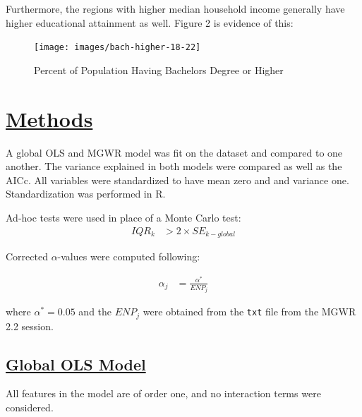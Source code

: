 \documentclass[
]{article}
\begin{document}
\newpage

Furthermore, the regions with higher median household income generally
have higher educational attainment as well. Figure 2 is evidence of
this:

\begin{figure}[H]

{\centering \texttt{[image: images/bach-higher-18-22]} 

}

\caption{Percent of Population Having Bachelors Degree or Higher}\label{fig:unnamed-chunk-4}
\end{figure}

\newpage

\section{\texorpdfstring{\ul{Methods}}{Methods}}\label{methods}

A global OLS and MGWR model was fit on the dataset and compared to one
another. The variance explained in both models were compared as well as
the AICc. All variables were standardized to have mean zero and and
variance one. Standardization was performed in R.

Ad-hoc tests were used in place of a Monte Carlo test:\\

\[
\begin{aligned}
IQR_{k} &> 2\times SE_{k-global}
\end{aligned}
\]

Corrected \(\alpha\)-values were computed following:

\[
\begin{aligned}
\alpha_{j} &= \frac{\alpha^{*}}{ENP_{j}}
\end{aligned}
\]

where \(\alpha^{*} = 0.05\) and the \(ENP_{j}\) were obtained from the
\texttt{txt} file from the MGWR 2.2 session.

\subsection{\texorpdfstring{\ul{Global OLS
Model}}{Global OLS Model}}\label{global-ols-model}

All features in the model are of order one, and no interaction terms
were considered.
\end{document}
